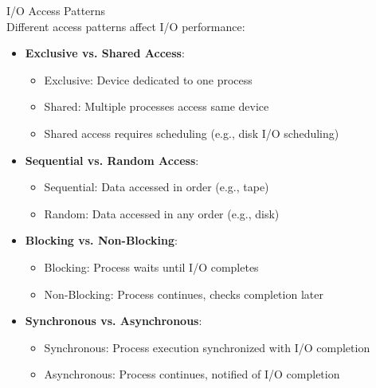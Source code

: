 \begin{definition}{I/O Access Patterns}\\
    Different access patterns affect I/O performance:
    \begin{itemize}
        \item \textbf{Exclusive vs. Shared Access}:
            \begin{itemize}
                \item Exclusive: Device dedicated to one process
                \item Shared: Multiple processes access same device
                \item Shared access requires scheduling (e.g., disk I/O scheduling)
            \end{itemize}
        \item \textbf{Sequential vs. Random Access}:
            \begin{itemize}
                \item Sequential: Data accessed in order (e.g., tape)
                \item Random: Data accessed in any order (e.g., disk)
            \end{itemize}
        \item \textbf{Blocking vs. Non-Blocking}:
            \begin{itemize}
                \item Blocking: Process waits until I/O completes
                \item Non-Blocking: Process continues, checks completion later
            \end{itemize}
        \item \textbf{Synchronous vs. Asynchronous}:
            \begin{itemize}
                \item Synchronous: Process execution synchronized with I/O completion
                \item Asynchronous: Process continues, notified of I/O completion
            \end{itemize}
    \end{itemize}
\end{definition}


